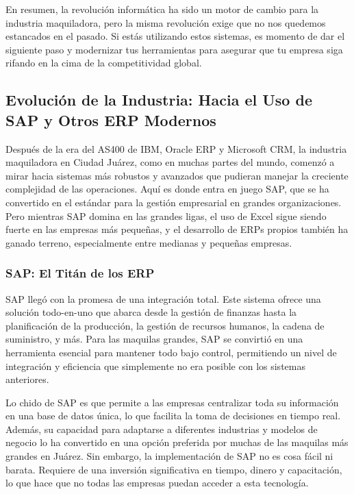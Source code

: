 \documentclass[
  letterpaper,
]{book}
\begin{document}
En resumen, la revolución informática ha sido un motor de cambio para la
industria maquiladora, pero la misma revolución exige que no nos
quedemos estancados en el pasado. Si estás utilizando estos sistemas, es
momento de dar el siguiente paso y modernizar tus herramientas para
asegurar que tu empresa siga rifando en la cima de la competitividad
global.

\subsection{Evolución de la Industria: Hacia el Uso de SAP y Otros ERP
Modernos}\label{evoluciuxf3n-de-la-industria-hacia-el-uso-de-sap-y-otros-erp-modernos}

Después de la era del AS400 de IBM, Oracle ERP y Microsoft CRM, la
industria maquiladora en Ciudad Juárez, como en muchas partes del mundo,
comenzó a mirar hacia sistemas más robustos y avanzados que pudieran
manejar la creciente complejidad de las operaciones. Aquí es donde entra
en juego SAP, que se ha convertido en el estándar para la gestión
empresarial en grandes organizaciones. Pero mientras SAP domina en las
grandes ligas, el uso de Excel sigue siendo fuerte en las empresas más
pequeñas, y el desarrollo de ERPs propios también ha ganado terreno,
especialmente entre medianas y pequeñas empresas.

\subsubsection{SAP: El Titán de los
ERP}\label{sap-el-tituxe1n-de-los-erp}

SAP llegó con la promesa de una integración total. Este sistema ofrece
una solución todo-en-uno que abarca desde la gestión de finanzas hasta
la planificación de la producción, la gestión de recursos humanos, la
cadena de suministro, y más. Para las maquilas grandes, SAP se convirtió
en una herramienta esencial para mantener todo bajo control, permitiendo
un nivel de integración y eficiencia que simplemente no era posible con
los sistemas anteriores.

Lo chido de SAP es que permite a las empresas centralizar toda su
información en una base de datos única, lo que facilita la toma de
decisiones en tiempo real. Además, su capacidad para adaptarse a
diferentes industrias y modelos de negocio lo ha convertido en una
opción preferida por muchas de las maquilas más grandes en Juárez. Sin
embargo, la implementación de SAP no es cosa fácil ni barata. Requiere
de una inversión significativa en tiempo, dinero y capacitación, lo que
hace que no todas las empresas puedan acceder a esta tecnología.
\end{document}
